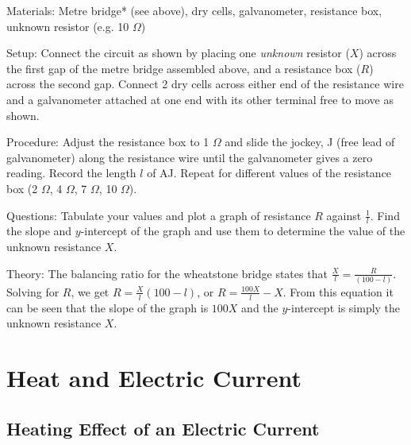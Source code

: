 \begin{multicols}{2}
\begin{description*}
\item[Materials:]{Metre bridge* (see above), dry cells, galvanometer, resistance box, unknown resistor (e.g. 10 $\Omega$)}
\item[Setup:]{Connect the circuit as shown by placing one \emph{unknown} resistor ($X$) across the first gap of the metre bridge assembled above, and a resistance box ($R$) across the second gap. Connect 2 dry cells across either end of the resistance wire and a galvanometer attached at one end with its other terminal free to move as shown.}
\item[Procedure:]{Adjust the resistance box to 1 $\Omega$ and slide the jockey, J (free lead of galvanometer) along the resistance wire until the galvanometer gives a zero reading. Record the length $l$ of AJ. Repeat for different values of the resistance box (2 $\Omega$, 4 $\Omega$, 7 $\Omega$, 10 $\Omega$).}
\item[Questions:]{Tabulate your values and plot a graph of resistance $R$ against $\frac{1}{l}$. Find the slope and $y$-intercept of the graph and use them to determine the value of the unknown resistance $X$.}
\item[Theory:]{The balancing ratio for the wheatstone bridge states that $\frac{X}{l} = \frac{R}{(100-l)}$. Solving for $R$, we get $R = \frac{X}{l}(100-l)$, or $R = \frac{100X}{l}-X$. From this equation it can be seen that the slope of the graph is $100X$ and the $y$-intercept is simply the unknown resistance $X$.}
\end{description*}


\section*{Heat and Electric Current}


\subsection{Heating Effect of an Electric Current}


\end{multicols}
